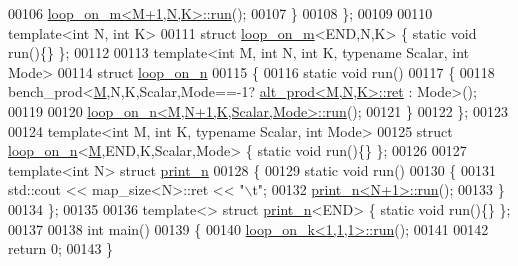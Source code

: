 \begin{DoxyCode}
00106     \hyperlink{structloop__on__m}{loop\_on\_m<M+1,N,K>::run}();
00107   \}
00108 \};
00109 
00110 \textcolor{keyword}{template}<\textcolor{keywordtype}{int} N, \textcolor{keywordtype}{int} K>
00111 \textcolor{keyword}{struct }\hyperlink{structloop__on__m}{loop\_on\_m}<END,N,K> \{ \textcolor{keyword}{static} \textcolor{keywordtype}{void} run()\{\} \};
00112 
00113 \textcolor{keyword}{template}<\textcolor{keywordtype}{int} M, \textcolor{keywordtype}{int} N, \textcolor{keywordtype}{int} K, \textcolor{keyword}{typename} Scalar, \textcolor{keywordtype}{int} Mode>
00114 \textcolor{keyword}{struct }\hyperlink{structloop__on__n}{loop\_on\_n}
00115 \{
00116   \textcolor{keyword}{static} \textcolor{keywordtype}{void} run()
00117   \{
00118     bench\_prod<\hyperlink{group___core___module_class_eigen_1_1_matrix}{M},N,K,Scalar,Mode==-1? \hyperlink{structalt__prod}{alt\_prod<M,N,K>::ret} : Mode>();
00119     
00120     \hyperlink{structloop__on__n}{loop\_on\_n<M,N+1,K,Scalar,Mode>::run}();
00121   \}
00122 \};
00123 
00124 \textcolor{keyword}{template}<\textcolor{keywordtype}{int} M, \textcolor{keywordtype}{int} K, \textcolor{keyword}{typename} Scalar, \textcolor{keywordtype}{int} Mode>
00125 \textcolor{keyword}{struct }\hyperlink{structloop__on__n}{loop\_on\_n}<\hyperlink{group___core___module_class_eigen_1_1_matrix}{M},END,K,Scalar,Mode> \{ \textcolor{keyword}{static} \textcolor{keywordtype}{void} run()\{\} \};
00126 
00127 \textcolor{keyword}{template}<\textcolor{keywordtype}{int} N> \textcolor{keyword}{struct }\hyperlink{structprint__n}{print\_n}
00128 \{
00129   \textcolor{keyword}{static} \textcolor{keywordtype}{void} run()
00130   \{
00131     std::cout << map\_size<N>::ret << \textcolor{stringliteral}{"\(\backslash\)t"};
00132     \hyperlink{structprint__n}{print\_n<N+1>::run}();
00133   \}
00134 \};
00135 
00136 \textcolor{keyword}{template}<> \textcolor{keyword}{struct }\hyperlink{structprint__n}{print\_n}<END> \{ \textcolor{keyword}{static} \textcolor{keywordtype}{void} run()\{\} \};
00137 
00138 \textcolor{keywordtype}{int} main()
00139 \{
00140   \hyperlink{structloop__on__k}{loop\_on\_k<1,1,1>::run}();
00141   
00142   \textcolor{keywordflow}{return} 0; 
00143 \}
\end{DoxyCode}
